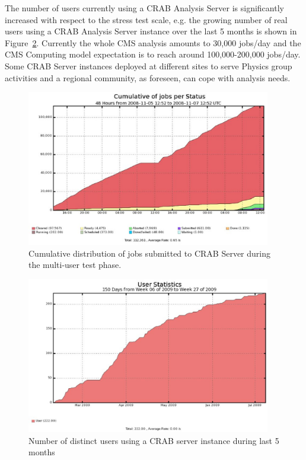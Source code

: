 The number of users currently using a CRAB Analysis Server is significantly 
increased with respect to the stress test scale, e.g. the growing number of real users using a CRAB Analysis Server instance over the last 5 months is shown in Figure~\ref{fig:CSusers}.
Currently the whole CMS analysis amounts to 30,000 jobs/day and the
CMS Computing model expectation is to reach around 100,000-200,000 jobs/day. 
Some CRAB Server instances deployed at different sites to serve Physics
group activities and a regional community, as foreseen, can cope with
analysis needs.
\begin{figure}
\centering
\includegraphics[width=0.95\textwidth]{MultiUserJobStatus.eps}
\caption{Cumulative distribution of jobs submitted to CRAB Server
  during the multi-user test phase. }
\label{fig:stressmulti}
\end{figure}
\begin{figure}
\centering
\includegraphics[width=0.95\textwidth]{CSusersLast5months.eps}
\caption{Number of distinct users using a CRAB server instance during last 5 months}
\label{fig:CSusers}
\end{figure}



